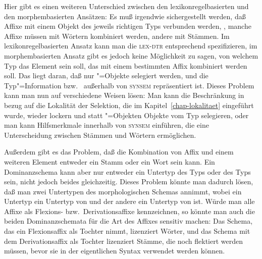 Hier gibt es einen weiteren Unterschied zwischen den lexikonregelbasierten und den morphembasierten Ansätzen:
Es muß irgendwie sichergestellt werden, daß Affixe mit einem Objekt des jeweils richtigen Typs verbunden werden,
\dash, manche Affixe müssen mit Wörtern kombiniert werden, andere mit Stämmen. 
Im lexikonregelbasierten Ansatz kann
man die \textsc{lex-dtr} entsprechend spezifizieren, im morphembasierten Ansatz gibt es jedoch keine Möglichkeit
zu sagen, von welchem Typ das Element sein soll, das mit einem bestimmten Affix kombiniert werden soll. Das liegt daran,
daß nur "=Objekte selegiert werden, und die Typ"=Information  bzw.\  außerhalb
von \textsc{synsem} repräsentiert ist. Dieses Problem kann man nun auf verschiedene Weisen lösen:
Man kann die Beschränkung in bezug auf die Lokalität der Selektion, die im Kapitel~\ref{chap-lokalitaet}
eingeführt wurde, wieder lockern und statt "=Objekten Objekte vom Typ  selegieren, oder
man kann Hilfsmerkmale innerhalb von \textsc{synsem} einführen, die eine Unterscheidung zwischen Stämmen und Wörtern
ermöglichen.

Außerdem gibt es das Problem, daß die Kombination von Affix und einem weiteren Element entweder ein
Stamm oder ein Wort sein kann. Ein Dominanzschema kann aber nur entweder ein
Untertyp des Typs  oder des Typs  sein, nicht jedoch beides
gleichzeitig. Dieses Problem könnte man dadurch lösen, daß man zwei Untertypen des morphologischen
Schemas annimmt, wobei ein Untertyp ein Untertyp von  und der andere ein Untertyp von
 ist. Würde man alle Affixe als Flexions- bzw.\ Derivationsaffixe kennzeichnen, so könnte
man auch die beiden Dominanzschemata für die Art des Affixes sensitiv machen: Das Schema, das ein
Flexionsaffix als Tochter nimmt, lizenziert Wörter, und das Schema mit dem Derivationsaffix als
Tochter lizenziert Stämme, die noch flektiert werden müssen, bevor sie in der eigentlichen Syntax
verwendet werden können.





